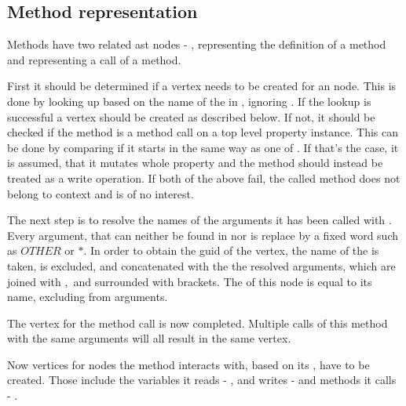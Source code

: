 \subsection{Method representation}
\label{concept:methods}
Methods have two related \gls{ast} nodes - , representing the definition of a method and  representing a call of a method. 

First it should be determined if a vertex needs to be created for an  node. This is done by looking up based on the name of the  in , ignoring . If the lookup is successful a vertex should be created as described below. If not, it should be checked if the method is a method call on a top level property instance. This can be done by comparing if it starts in the same way as one of . %
If that's the case, it is assumed, that it mutates whole property and the method should instead be treated as a write operation.
If both of the above fail, the called method does not belong to context and is of no interest.

The next step is to resolve the names of the arguments it has been called with . Every argument, that can neither be found in  nor  is replace by a fixed word such as $OTHER$ or $*$. In order to obtain the \gls{guid} of the vertex, the name of the  is taken,  is excluded, and concatenated with the the resolved arguments, which are joined with $,$ and surrounded with brackets. The  of this node is equal to its name, excluding  from arguments. 

The vertex for the method call is now completed. Multiple calls of this method with the same arguments will all result in the same vertex.

Now vertices for nodes the method interacts with, based on its , have to be created. Those include the variables it reads - , and writes -  and methods it calls - . 


